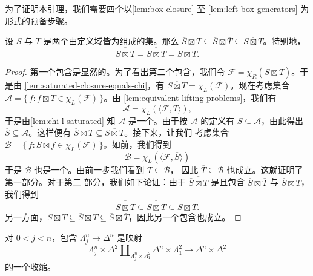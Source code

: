 为了证明本引理，我们需要四个以\cref{lem:box-closure} 至%
\cref{lem:left-box-generators} 为形式的预备步骤。

\begin{lemma}\label{lem:box-closure}
设 $S$ 与 $T$ 是两个由定义域皆为\trCompact{}\trMorphism{}组成的集。那么
$\overline{S} \boxtimes T \subseteq \overline{S} \boxtimes \overline{T} \subseteq \overline{S \boxtimes T}$。特别地，
\[
\overline{\overline{S} \boxtimes T} =
\overline{\overline{S} \boxtimes \overline{T}} =
\overline{S \boxtimes T}.
\]
\end{lemma}

\begin{proof}
第一个包含是显然的。为了看出第二个包含，我们令
$\mathcal{F} = \chi_R(\overline{S \boxtimes T})$。于是由%
\cref{lem:saturated-closure-equals-chi}，有
$\overline{S \boxtimes T} = \chi_L(\mathcal{F})$。现在考虑集合
$\mathcal{A} = \{\, f : f \boxtimes T \in \chi_L(\mathcal{F}) \,\}$。由%
\cref{lem:equivalent-lifting-problems}，我们有
\[
\mathcal{A} = \chi_L(\langle \mathcal{F}, T \rangle),
\]
于是由\cref{lem:chi-l-saturated} 知 $\mathcal{A}$ 是一个\trSaturatedSet{}。由于按
$\mathcal{A}$ 的定义有 $S \subseteq \mathcal{A}$，由此得出
$\overline{S} \subseteq \mathcal{A}$。这样便有
$\overline{S} \boxtimes T \subseteq \overline{S \boxtimes T}$。接下来，让我们
考虑集合 $\mathcal{B} = \{\, f : \overline{S} \boxtimes f \in \chi_L(\mathcal{F}) \,\}$。如前，我们得到
\[
\mathcal{B} = \chi_L(\langle \mathcal{F}, \overline{S} \rangle)
\]
于是 $\mathcal{B}$ 也是一个\trSaturatedSet{}。由前一步我们看到 $T \subseteq \mathcal{B}$，
因此 $\overline{T} \subseteq \mathcal{B}$ 也成立。这就证明了第一部分。对于第二
部分，我们如下论证：由于 $\overline{\overline{S} \boxtimes T}$ 是\trSaturated{}且包含
$\overline{S} \boxtimes \overline{T}$ 与 $\overline{S} \boxtimes T$，我们得到
\[
\overline{\overline{S} \boxtimes T} \subseteq
\overline{\overline{S} \boxtimes \overline{T}} \subseteq
\overline{S \boxtimes T}.
\]
另一方面，$S \boxtimes T \subseteq \overline{S} \boxtimes T \subseteq \overline{S} \boxtimes \overline{T}$，因此另一个包含也成立。
\end{proof}

\begin{lemma}\label{lem:horn-retract-box}
对 $0 < j < n$，包含 $\Lambda^n_j \to \Delta^n$ 是映射
\[
\Lambda^n_j \times \Delta^2 \amalg_{\Lambda^n_j \times \Lambda^2_1}
\Delta^n \times \Lambda^2_1 \to \Delta^n \times \Delta^2
\]
的一个收缩。
\end{lemma}

